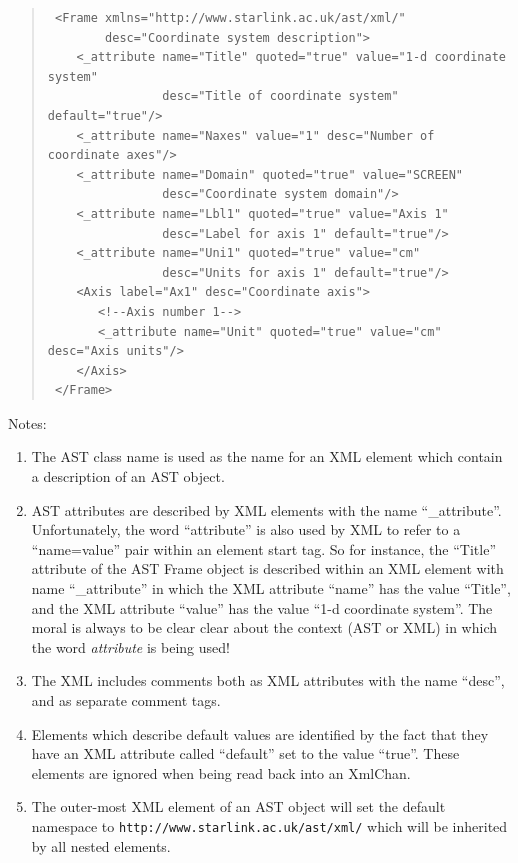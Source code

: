 \documentclass[twoside,11pt]{article}
\begin{document}
\begin{quote}
\small
\begin{verbatim}
 <Frame xmlns="http://www.starlink.ac.uk/ast/xml/"
        desc="Coordinate system description">
    <_attribute name="Title" quoted="true" value="1-d coordinate system"
                desc="Title of coordinate system" default="true"/>
    <_attribute name="Naxes" value="1" desc="Number of coordinate axes"/>
    <_attribute name="Domain" quoted="true" value="SCREEN"
                desc="Coordinate system domain"/>
    <_attribute name="Lbl1" quoted="true" value="Axis 1"
                desc="Label for axis 1" default="true"/>
    <_attribute name="Uni1" quoted="true" value="cm"
                desc="Units for axis 1" default="true"/>
    <Axis label="Ax1" desc="Coordinate axis">
       <!--Axis number 1-->
       <_attribute name="Unit" quoted="true" value="cm" desc="Axis units"/>
    </Axis>
 </Frame>
\end{verbatim}
\normalsize
\end{quote}


Notes:

\begin{enumerate}
\item The AST class name is used as the name for an XML element which contain
a description of an AST object.

\item AST attributes are described by XML elements with the name
``\_attribute''. Unfortunately, the word ``attribute'' is also used by XML
to refer to a ``name=value'' pair within an element start tag. So for
instance, the ``Title'' attribute of the AST Frame object is described
within an XML element with name ``\_attribute'' in which the XML attribute
``name'' has the value ``Title'', and the XML attribute ``value'' has the
value ``1-d coordinate system''. The moral is always to be clear clear
about the context (AST or XML) in which the word \emph{attribute} is being
used!

\item The XML includes comments both as XML attributes with the name ``desc'',
and as separate comment tags.

\item Elements which describe default values are identified by the fact
that they have an XML attribute called ``default'' set to the value
``true''. These elements are ignored when being read back into an XmlChan.

\item The outer-most XML element of an AST object will set the default
namespace to \verb+http://www.starlink.ac.uk/ast/xml/+ which will be
inherited by all nested elements.

\end{enumerate}
\end{document}
